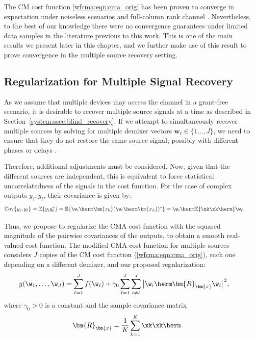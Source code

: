 The CM cost function \ref{wfcma:eqn:cma_orig} has been proven to converge in expectation under noiseless scenarios and full-column rank channel \cite{Ding2000,LiDing1994cmaglobalconvergencefse}. Nevertheless, to the best of our knowledge there were no convergence guarantees under limited data samples in the literature previous to this work. This is one of the main results we present later in this chapter, and we further make use of this result to prove convergence in the multiple source recovery setting. 

\subsection{Regularization for Multiple Signal Recovery}

As we assume that multiple devices may access the channel in a grant-free scenario, it is desirable to recover  multiple source signals at a time as described in Section~\ref{system:ssec:blind_recovery}. If we attempt to simultaneously recover multiple sources by solving for multiple demixer vectors $\bm{w}_{\ell}\in\{1\ldots,J\}$, we need to ensure that they do not restore the same source signal, possibly with different phases or delays \cite{Ding2000}. 

Therefore, additional adjustments must be considered. Now, given that the different sources are independent, this is equivalent to force statistical uncorrelatedness of the signals in the cost function. 
For the case of complex outputs $y_{\ell},y_{i}$, their covariance is given by:
\begin{align}
\mathrm{Cov}\{y_{i},y_{\ell}\}
&=\mathbb{E}\{y_{i}y_{\ell}^*\}
=\mathbb{E}\{\w_{i}\herm\bm{x_k}(\w_{\ell}\herm\bm{x_k})^*\}
=\w_{i}\herm\mathbb{E}\{\xk\xk\herm\}\w_{\ell}.
\end{align}

Thus, we propose to regularize the CMA cost function with the squared magnitude of the pairwise covariances of the outputs, to obtain a smooth real-valued cost function. The modified CMA cost function for multiple sources considers $J$ copies of the CM cost function (\ref{wfcma:eqn:cma_orig}), each one depending on a different demixer, and our proposed regularization:
\begin{align}
&g(\w_1,\ldots,\w_J)=%
\sum_{\ell=1}^Jf(\w_\ell) +\gamma_0\sum_{\ell=1}^J\sum_{i\neq \ell}^J\big|\w_{i}\herm\bm{R}_{\bm{x}}\w_{\ell}\big|^2, \label{wfcma:eqn:cma_msr}
\end{align}
where $\gamma_0>0$ is a constant and the sample covariance matrix
\begin{align}
\bm{R}_{\bm{x}}=\frac{1}{K}\sum_{k=1}^K\xk\xk\herm.
\end{align}  

